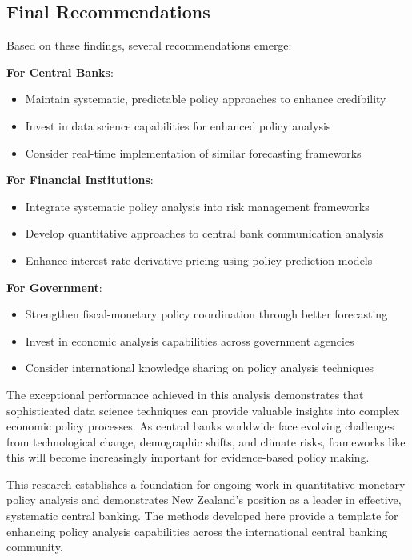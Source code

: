 \documentclass[11pt,a4paper]{article}
\begin{document}
	\subsection{Final Recommendations}
	Based on these findings, several recommendations emerge:
	
	\textbf{For Central Banks}:
	\begin{itemize}
		\item Maintain systematic, predictable policy approaches to enhance credibility
		\item Invest in data science capabilities for enhanced policy analysis
		\item Consider real-time implementation of similar forecasting frameworks
	\end{itemize}
	
	\textbf{For Financial Institutions}:
	\begin{itemize}
		\item Integrate systematic policy analysis into risk management frameworks
		\item Develop quantitative approaches to central bank communication analysis
		\item Enhance interest rate derivative pricing using policy prediction models
	\end{itemize}
	
	\textbf{For Government}:
	\begin{itemize}
		\item Strengthen fiscal-monetary policy coordination through better forecasting
		\item Invest in economic analysis capabilities across government agencies
		\item Consider international knowledge sharing on policy analysis techniques
	\end{itemize}
	
	The exceptional performance achieved in this analysis demonstrates that sophisticated data science techniques can provide valuable insights into complex economic policy processes. As central banks worldwide face evolving challenges from technological change, demographic shifts, and climate risks, frameworks like this will become increasingly important for evidence-based policy making.
	
	This research establishes a foundation for ongoing work in quantitative monetary policy analysis and demonstrates New Zealand's position as a leader in effective, systematic central banking. The methods developed here provide a template for enhancing policy analysis capabilities across the international central banking community.
	
\end{document}
